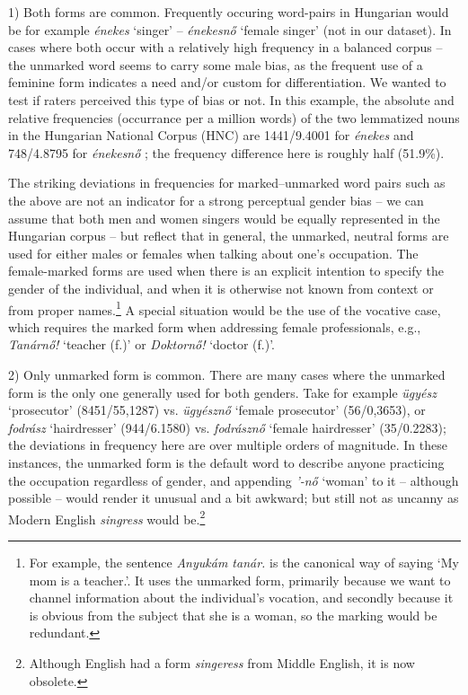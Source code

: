 \documentclass[10pt, a4paper]{article}
\begin{document}
1) Both forms are common. Frequently occuring word-pairs in Hungarian would be for example \textit{énekes} `singer' -- \textit{énekesnő} `female singer' (not in our dataset). In cases where both occur with a relatively high frequency in a balanced corpus -- the unmarked word seems to carry some male bias, as the frequent use of a feminine form indicates a need and/or custom for differentiation. We wanted to test if raters perceived this type of bias or not. In this example, the absolute and relative frequencies (occurrance per a million words) of the two lemmatized nouns in the Hungarian National Corpus (HNC) are 1441/9.4001 for \textit{énekes} and 748/4.8795 for \textit{énekesnő} \citep{varadi_2002_hungarian, oravecz_2014_hungarian}; the frequency difference here is roughly half (51.9\%).

The striking deviations in frequencies for marked--unmarked word pairs such as the above are not an indicator for a strong perceptual gender bias -- we can assume that both men and women singers would be equally represented in the Hungarian corpus -- but reflect that in general, the unmarked, neutral forms are used for either males or females when talking about one's occupation. The female-marked forms are used when there is an explicit intention to specify the gender of the individual, and when it is otherwise not known from context or from proper names.\footnote{For example, the sentence \textit{Anyukám tanár.} is the canonical way of saying `My mom is a teacher.'. It uses the unmarked form, primarily because we want to channel information about the individual's vocation, and secondly because it is obvious from the subject that she is a woman, so the marking would be redundant.} A special situation would be the use of the vocative case, which requires the marked form when addressing female professionals, e.g., \textit{Tanárnő!} `teacher (f.)' or \textit{Doktornő!} `doctor (f.)'.

2) Only unmarked form is common. There are many cases where the unmarked form is the only one generally used for both genders. Take for example \textit{ügyész} `prosecutor' (8451/55,1287) vs. \textit{ügyésznő} `female prosecutor' (56/0,3653), or \textit{fodrász} `hairdresser' (944/6.1580) vs. \textit{fodrásznő} `female hairdresser' (35/0.2283); the deviations in frequency here are over multiple orders of magnitude. In these instances, the unmarked form is the default word to describe anyone practicing the occupation regardless of gender, and appending \textit{'-nő} `woman' to it -- although possible -- would render it unusual and a bit awkward; but still not as uncanny as Modern English \textit{singress} would be.\footnote{Although English had a form \textit{singeress} from Middle English, it is now obsolete.}
\end{document}
